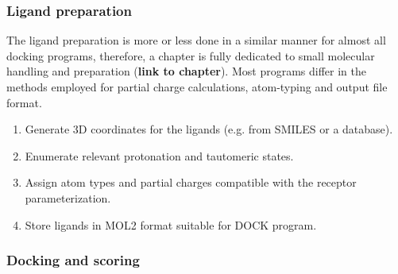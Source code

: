 \documentclass[12pt, a4paper]{article}
\begin{document}
\subsubsection{Ligand preparation}
The ligand preparation is more or less done in a similar manner for almost all docking programs, therefore, a chapter is fully dedicated to small molecular handling and preparation (\textbf{link to chapter}). Most programs differ in the methods employed for partial charge calculations, atom-typing and output file format.

\begin{enumerate}
  \item Generate 3D coordinates for the ligands (e.g. from SMILES or a database).
  \item Enumerate relevant protonation and tautomeric states.
  \item Assign atom types and partial charges compatible with the receptor parameterization.
  \item Store ligands in MOL2 format suitable for DOCK program.
\end{enumerate}

\subsubsection{Docking and scoring}
\end{document}
